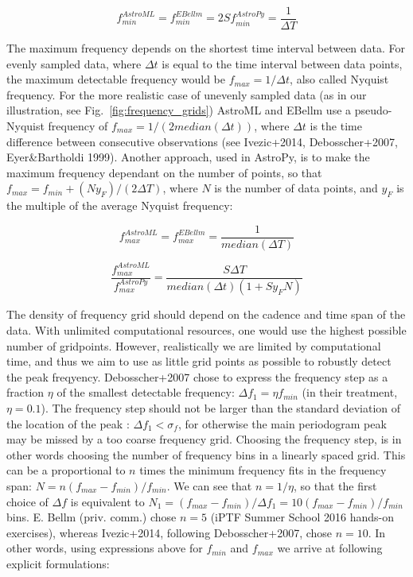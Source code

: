\documentclass[fleqn,usenatbib]{mnras}  %
\begin{document}
\begin{equation}
f_{min}^{AstroML} = f_{min}^{EBellm} = 2 S f_{min}^{AstroPy} = \frac{1}{\Delta T}
\end{equation} 

The maximum frequency depends on the shortest time interval between data.  For evenly sampled data,  where $\Delta t$ is equal to the time interval between data points, the maximum detectable frequency would be $f_{max} = 1 / \Delta t$, also called Nyquist frequency. 
For the more realistic case of unevenly sampled data (as in our illustration, see Fig.~\ref{fig:frequency_grids}) AstroML and EBellm use a pseudo-Nyquist frequency of $f_{max} = 1 / (2 median(\Delta t))$, where $\Delta t $ is the time difference between consecutive observations (see Ivezic+2014,  Debosscher+2007, Eyer\&Bartholdi 1999). Another approach, used in AstroPy, is to make the maximum frequency dependant on the number of points, so that $f_{max} = f_{min} + (N y_{F}) / (2 \Delta T)$, where $N$ is the number of data points, and $y_{F}$ is the  multiple of the average Nyquist frequency: 

\begin{equation}
f_{max}^{AstroML} = f_{max}^{EBellm} = \frac{1}{median(\Delta T)}
\end{equation}

\begin{equation}
\frac{f_{max}^{AstroML}}{f_{max}^{AstroPy}} = \frac{S \Delta T }{median(\Delta t) (1 + S y_{F} N)}
\end{equation}


The density of frequency grid should depend on the cadence and time span of the data. With unlimited computational resources, one would use the highest possible number of gridpoints.   However, realistically we are limited by computational time, and thus we aim to use as little grid points as possible to robustly detect the peak freqyency.  Debosscher+2007 chose to express the frequency step as a fraction $\eta$ of the smallest detectable frequency: $\Delta f_{1} = \eta f_{min}$ (in their treatment, $\eta = 0.1$). The frequency step should not be larger than the standard deviation of the location of the peak : $\Delta f_{1} < \sigma_{f}$, for otherwise the main periodogram peak may be missed by a too coarse frequency grid.  
Choosing the frequency step, is in other words choosing the number of frequency bins in a linearly spaced grid.
This can be a proportional to $n$ times the minimum frequency fits in the frequency span:  $N = n (f_{max} - f_{min}) / f_{min}$. We can see that $n = 1 / \eta$, so that the first choice of $\Delta f$ is equivalent to $N_{1} = (f_{max} - f_{min}) / \Delta f_{1} = 10 (f_{max} - f_{min}) / f_{min}$ bins. E. Bellm (priv. comm.) chose $n=5$ (iPTF Summer School 2016 hands-on exercises), whereas Ivezic+2014, following Debosscher+2007, chose $n=10$.  In other words, using expressions above for $f_{min}$ and $f_{max}$ we arrive at following explicit formulations: 
\end{document}
